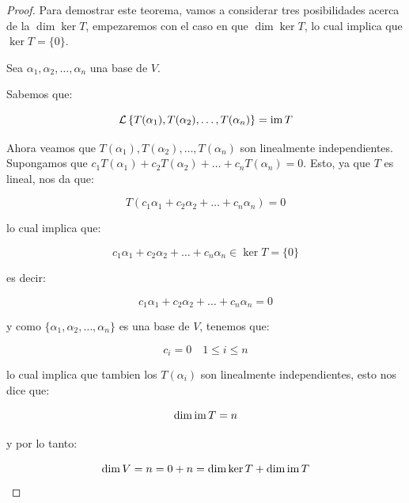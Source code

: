 		\begin{proof}
			Para demostrar este teorema, vamos a considerar tres posibilidades acerca de la $\dim{\ker{T}}$, empezaremos con el caso en que $\dim{\ker{T}}$, lo cual implica que $\ker{T} = \{0\}$.

			Sea $\alpha_1, \alpha_2, \dots, \alpha_n$ una base de $V$.

			Sabemos que:

			\begin{equation*}
				\mathcal{L} \left\{ T(\alpha_1), T(\alpha_2), \dots, T(\alpha_n) \right\} = \operatorname{im}{T}
			\end{equation*}

			Ahora veamos que $T(\alpha_1), T(\alpha_2), \dots, T(\alpha_n)$ son linealmente independientes.
			Supongamos que $c_1 T(\alpha_1) + c_2 T(\alpha_2) + \dots + c_n T(\alpha_n) = 0$. Esto, ya que $T$ es lineal, nos da que:

			\begin{equation*}
				T(c_1 \alpha_1 + c_2 \alpha_2 + \dots + c_n \alpha_n) = 0
			\end{equation*}

			lo cual implica que:

			\begin{equation*}
				c_1 \alpha_1 + c_2 \alpha_2 + \dots + c_n \alpha_n \in \ker{T} = \{0\}
			\end{equation*}

			es decir:

			\begin{equation*}
				c_1 \alpha_1 + c_2 \alpha_2 + \dots + c_n \alpha_n = 0
			\end{equation*}

			y como $\{\alpha_1, \alpha_2, \dots, \alpha_n\}$ es una base de $V$, tenemos que:

			\begin{equation*}
				c_i = 0 \quad 1 \leq i \leq n
			\end{equation*}

			lo cual implica que tambien los $T(\alpha_i)$ son linealmente independientes, esto nos dice que:

			\begin{equation*}
				\dim{\operatorname{im}{T}} = n
			\end{equation*}

			y por lo tanto:

			\begin{equation*}
				\dim{V} = n = 0 + n = \dim{\ker{T}} + \dim{\operatorname{im}{T}}
			\end{equation*}


\end{proof}
